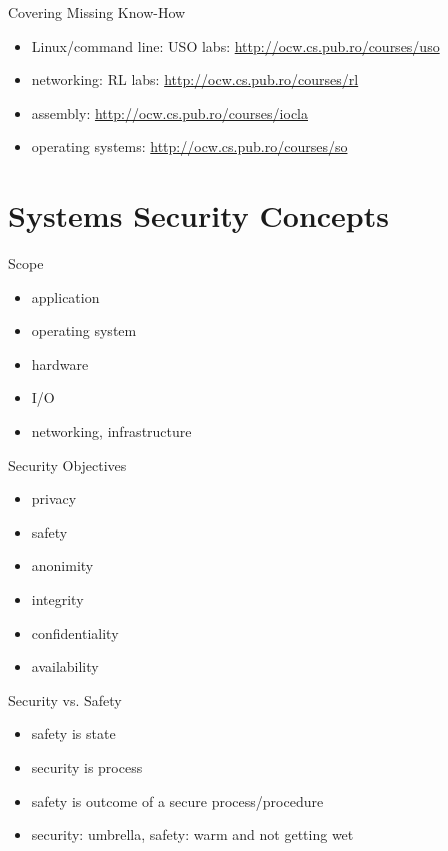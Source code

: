 \documentclass{curs}
\begin{document}
\begin{frame}{Covering Missing Know-How}
  \begin{itemize}
    \item Linux/command line: USO labs: \url{http://ocw.cs.pub.ro/courses/uso}
    \item networking: RL labs: \url{http://ocw.cs.pub.ro/courses/rl}
    \item assembly: \url{http://ocw.cs.pub.ro/courses/iocla}
    \item operating systems: \url{http://ocw.cs.pub.ro/courses/so}
  \end{itemize}
\end{frame}


\section{Systems Security Concepts}

\begin{frame}{Scope}
  \begin{itemize}
    \item application
    \item operating system
    \item hardware
    \item I/O
    \item networking, infrastructure
  \end{itemize}
\end{frame}

\begin{frame}{Security Objectives}
  \begin{itemize}
    \item privacy
    \item safety
    \item anonimity
    \item integrity
    \item confidentiality
    \item availability
  \end{itemize}
\end{frame}

\begin{frame}{Security vs. Safety}
  \begin{itemize}
    \item safety is state
    \item security is process
    \item safety is outcome of a secure process/procedure
    \item security: umbrella, safety: warm and not getting wet
  \end{itemize}
\end{frame}
\end{document}

